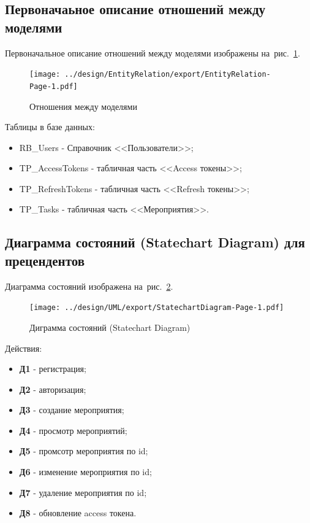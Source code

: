 \newpage
\subsection{Первоначаьное описание отношений между моделями}

Первоначальное описание отношений между моделями изображены на~рис.~\ref{fig:EntityRelation}.

\begin{figure}[!ph]
  \centering

  \texttt{[image: ../design/EntityRelation/export/EntityRelation-Page-1.pdf]}

  \caption{Отношения между моделями}
  \label{fig:EntityRelation}
\end{figure}

Таблицы в базе данных:
\begin{itemize}
  \item RB\_Users - Справочник <<Пользователи>>;
  \item TP\_AccessTokens - табличная часть <<Access токены>>;
  \item TP\_RefreshTokens - табличная часть <<Refresh токены>>;
  \item TP\_Tasks - табличная часть <<Мероприятия>>.
\end{itemize}


\newpage
\subsection{Диаграмма состояний (Statechart Diagram) для прецендентов}

Диаграмма состояний изображена на~рис.~\ref{fig:StatechartDiagram}.

\begin{figure}[!ph]
  \centering

  \texttt{[image: ../design/UML/export/StatechartDiagram-Page-1.pdf]}

  \caption{Диграмма состояний (Statechart Diagram)}
  \label{fig:StatechartDiagram}
\end{figure}

Действия:
\begin{itemize}
  \item \textbf{Д1} - регистрация;
  \item \textbf{Д2} - авторизация;
  \item \textbf{Д3} - создание мероприятия;
  \item \textbf{Д4} - просмотр мероприятий;
  \item \textbf{Д5} - промсотр мероприятия по id;
  \item \textbf{Д6} - изменение мероприятия по id;
  \item \textbf{Д7} - удаление мероприятия по id;
  \item \textbf{Д8} - обновление access токена.
\end{itemize}


